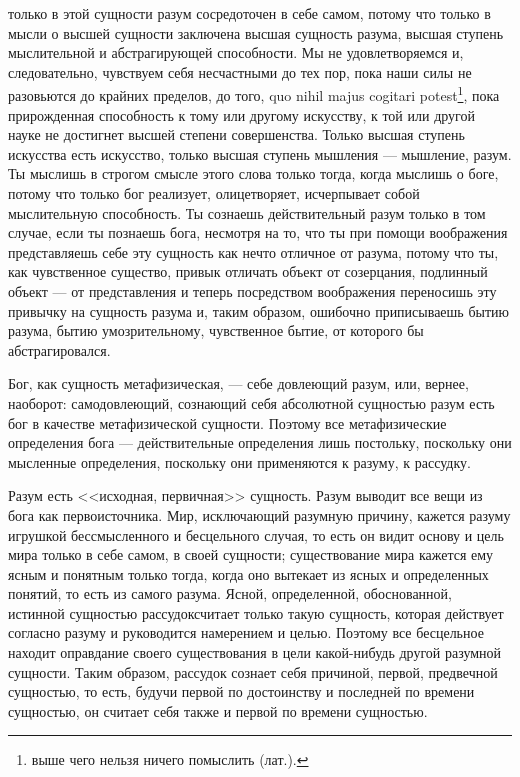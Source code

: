\documentclass[12pt,oneside]{book}
\begin{document}
только в этой сущности разум сосредоточен в себе самом, потому что только в мысли о высшей сущности заключена высшая сущность разума, высшая ступень мыслительной и абстрагирующей способности. Мы не удовлетворяемся и, следовательно, чувствуем себя несчастными до тех пор, пока наши силы не разовьются до крайних пределов, до того, quo nihil majus cogitari potest\footnote{выше чего нельзя ничего помыслить (лат.).}, пока прирожденная способность к тому или другому искусству, к той или другой науке не достигнет высшей степени совершенства. Только высшая ступень искусства есть искусство, только высшая ступень мышления --- мышление, разум. Ты мыслишь в строгом смысле этого слова только тогда, когда мыслишь о боге, потому что только бог реализует, олицетворяет, исчерпывает собой мыслительную способность. Ты сознаешь действительный разум только в том случае, если ты познаешь бога, несмотря на то, что ты при помощи воображения представляешь себе эту сущность как нечто отличное от разума, потому что ты, как чувственное существо, привык отличать объект от созерцания, подлинный объект --- от представления и теперь посредством воображения переносишь эту привычку на сущность разума и, таким образом, ошибочно приписываешь бытию разума, бытию умозрительному, чувственное бытие, от которого бы абстрагировался.




Бог, как сущность метафизическая, --- себе довлеющий разум, или, вернее, наоборот: самодовлеющий, сознающий себя абсолютной сущностью разум есть бог в качестве метафизической сущности. Поэтому все метафизические определения бога --- действительные определения лишь постольку, поскольку они мысленные определения, поскольку они применяются к разуму, к рассудку.

Разум есть <<исходная, первичная>> сущность. Разум выводит все вещи из бога как первоисточника. Мир, исключающий разумную причину, кажется разуму игрушкой бессмысленного и бесцельного случая, то есть он видит основу и цель мира только в себе самом, в своей сущности; существование мира кажется ему ясным и понятным только тогда, когда оно вытекает из ясных и определенных понятий, то есть из самого разума. Ясной, определенной, обоснованной, истинной сущностью рассудок\dag\let\svthefootnote\thefootnote\let\thefootnote\relax{}\let\thefootnote\svthefootnote считает только такую сущность, которая действует согласно разуму и руководится намерением и целью. Поэтому все бесцельное находит оправдание своего существования в цели какой-нибудь другой разумной сущности. Таким образом, рассудок сознает себя причиной, первой, предвечной сущностью, то есть, будучи первой по достоинству и последней по времени сущностью, он считает себя также и первой по времени сущностью.
\end{document}

